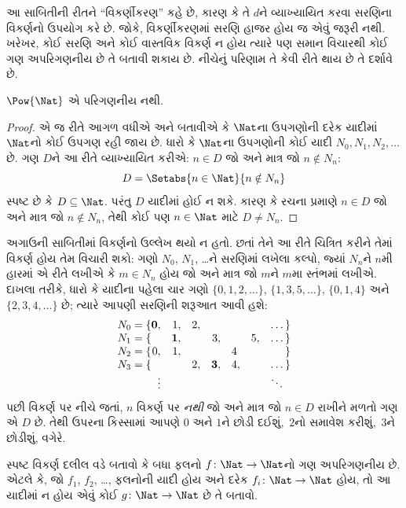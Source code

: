 \begin{explain}
આ સાબિતીની રીતને “વિકર્ણીકરણ” કહે છે, કારણ કે તે $d$ને વ્યાખ્યાયિત
કરવા સરણિના વિકર્ણનો ઉપયોગ કરે છે. જોકે, વિકર્ણીકરણમાં સરણિ હાજર
હોય જ એવું જરૂરી નથી. ખરેખર, કોઈ સરણિ અને કોઈ વાસ્તવિક વિકર્ણ ન
હોય ત્યારે પણ સમાન વિચારથી કોઈ ગણ અપરિગણનીય છે તે બતાવી
શકાય છે. નીચેનું પરિણામ તે કેવી રીતે થાય છે તે દર્શાવે છે.
\end{explain}

\begin{thm}
$\Pow{\Nat}$ એ પરિગણનીય નથી.
\end{thm}

\begin{proof}
એ જ રીતે આગળ વધીએ અને બતાવીએ કે $\Nat$ના ઉપગણોની દરેક યાદીમાં
$\Nat$નો કોઈ ઉપગણ રહી જાય છે. ધારો કે $\Nat$ના ઉપગણોની કોઈ યાદી
$N_0, N_1, N_2, \ldots$ છે. ગણ $D$ને આ રીતે વ્યાખ્યાયિત કરીએ:
$n \in D$ જો અને માત્ર જો $n \notin N_{n}$:
\[
D = \Setabs{n \in \Nat}{n \notin N_n}
\]
સ્પષ્ટ છે કે $D\subseteq \Nat$. પરંતુ $D$ યાદીમાં હોઈ ન શકે.
કારણ કે રચના પ્રમાણે $n \in D$ જો અને માત્ર જો $n\notin N_n$,
તેથી કોઈ પણ $n \in \Nat$ માટે $D \neq N_n$.
\end{proof}

\begin{explain}
અગાઉની સાબિતીમાં વિકર્ણનો ઉલ્લેખ થયો ન હતો. છતાં તેને આ રીતે
ચિત્રિત કરીને તેમાં વિકર્ણ હોય તેમ વિચારી શકો: ગણો $N_0$, $N_1$,
\dots{}ને સરણિમાં લખેલા કલ્પો, જ્યાં $N_n$ને $n$મી હારમાં એ રીતે
લખીએ કે $m \in N_n$ હોય જો અને માત્ર જો $m$ને $m$મા સ્તંભમાં
લખીએ. દાખલા તરીકે, ધારો કે યાદીના પહેલા ચાર ગણો
$\{0,1,2,\dots\}$, $\{1, 3, 5, \dots\}$, $\{0,1,4\}$ અને
$\{2,3,4,\dots\}$ છે; ત્યારે આપણી સરણિની શરૂઆત આવી હશે:
\[
\begin{array}{r@{}rrrrrrr}
  N_0 = \{ & \mathbf{0}, & 1, & 2, & & & & \dots\}\\
  N_1 = \{ &  & \mathbf{1}, &  & 3, &  & 5, & \dots\}\\
  N_2 = \{ & 0, & 1, &  &  & 4\phantom{,} &  & \}\\
  N_3 = \{ &  &  & 2, & \mathbf{3}, & 4, & & \dots\}\\
  &\vdots & & & & & & \ddots\phantom{\}}
  \end{array}
\]
પછી વિકર્ણ પર નીચે જતાં, $n$ વિકર્ણ પર \emph{નથી} જો અને માત્ર જો
$n \in D$ રાખીને મળતો ગણ એ $D$ છે. તેથી ઉપરના કિસ્સામાં આપણે
$0$ અને $1$ને છોડી દઈશું,~$2$નો સમાવેશ કરીશું,~$3$ને છોડીશું, વગેરે.
\end{explain}

\begin{prob}
સ્પષ્ટ વિકર્ણ દલીલ વડે બતાવો કે બધા ફલનો
$f \colon \Nat \to \Nat$નો ગણ અપરિગણનીય છે. એટલે કે,
જો $f_1$, $f_2$, \dots, ફલનોની યાદી હોય અને દરેક
$f_i\colon \Nat \to \Nat$ હોય, તો આ યાદીમાં ન હોય એવું કોઈ
$g \colon \Nat \to \Nat$ છે તે બતાવો.
\end{prob}
\endgroup

